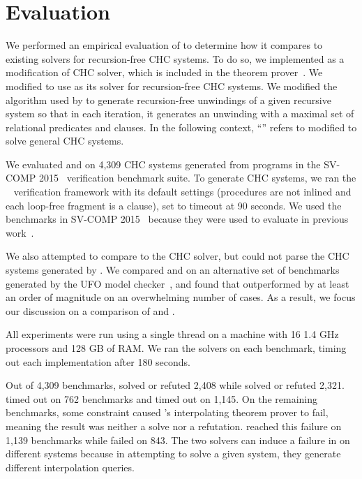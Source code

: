 \section{Evaluation}
\label{sec:evaluation}
We performed an empirical evaluation of \sys to determine how it
compares to existing solvers for recursion-free CHC systems.
%
To do so, we implemented \sys as a modification of \duality CHC
solver, which is included in the \zthree theorem prover~\cite{z3}.
%
We modified \duality to use \sys as its solver for recursion-free CHC
systems.
%
We modified the algorithm used by \duality to generate recursion-free
unwindings of a given recursive system so that in each iteration, it
generates an unwinding with a maximal set of relational predicates and
clauses.
%
In the following context, ``\sys'' refers to \duality modified to
solve general CHC systems.

We evaluated \sys and \duality on 4,309 CHC systems generated from
programs in the SV-COMP 2015~\cite{svcomp15} verification benchmark
suite.
%
To generate CHC systems, we ran the \seahorn~\cite{gurfinkel15}
verification framework with its default settings (procedures are not
inlined and each loop-free fragment is a clause), set to timeout at 90
seconds.
%
We used the benchmarks in SV-COMP 2015~\cite{svcomp15} because they
were used to evaluate \duality in previous work~\cite{mcmillan14}.

We also attempted to compare \sys to the \eldarica CHC solver, but
\eldarica could not parse the CHC systems generated by \seahorn.
%
We compared \sys and \eldarica on an alternative set of benchmarks
generated by the UFO model checker~\cite{albarghouthi12c}, and found
that \sys outperformed \eldarica by at least an order of magnitude on
an overwhelming number of cases.
%
As a result, we focus our discussion on a comparison of \sys and
\duality.

All experiments were run using a single thread 
on a machine with 16 1.4 GHz processors and
128 GB of RAM.
%
We ran the solvers on each benchmark, timing out each implementation
after 180 seconds.

Out of 4,309 benchmarks, \sys solved or refuted 2,408 while \duality
solved or refuted 2,321. \sys timed out on 762 benchmarks and \duality
timed out on 1,145.
%
On the remaining benchmarks, some constraint caused \zthree's
interpolating theorem prover to fail, meaning the result was neither a
solve nor a refutation. \sys reached this failure on 1,139 benchmarks
while \duality failed on 843.
%
The two solvers can induce a failure in \zthree on different systems
because in attempting to solve a given system, they generate different
interpolation queries.


